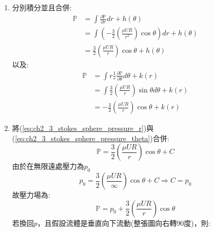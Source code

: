 \documentclass[../main.tex]{subfiles}
\begin{document}
\begin{itemize}
\begin{enumerate}
\begin{align}
            1 - \frac{3R}{4r} - \frac{R^3}{4r^3}
          \right) \sin\theta
        \right)
      \right) \right.\nonumber\\
      &\phantom{=\mu\quad} \left. + \frac{2}{r^2}\frac{\partial }{\partial \theta} \left(
        U \left(
          1 - \frac{3R}{2r} + \frac{R^3}{2r^3}
        \right) \cos\theta
      \right)
    \right] \nonumber\\
    &=\frac{3}{2}\left(
      \frac{\mu U R}{r^2}
    \right) \sin\theta
  \end{align}
  \item 分別積分並且合併:
  \begin{align}
    \mathbb{P} &= \int \frac{\partial \mathbb{P}}{\partial r} dr + h(\theta) \nonumber\\
    &= \int \left(
      -\frac{3}{2}\left(
        \frac{\mu U R}{r^2}
      \right) \cos\theta
    \right) dr + h(\theta) \nonumber\\
    &= \frac{3}{2}\left(
      \frac{\mu U R}{r}
    \right) \cos\theta + h(\theta) \label{eq:ch2_3_stokes_sphere_pressure_r}
  \end{align}
  以及:
  \begin{align}
    \mathbb{P} &= \int r \frac{1}{r}\frac{\partial \mathbb{P}}{\partial \theta} d\theta + k(r) \nonumber\\
    &= \int \frac{3}{2}\left(
      \frac{\mu U R}{r}
    \right) \sin\theta d\theta + k(r) \nonumber\\
    &= -\frac{3}{2}\left(
      \frac{\mu U R}{r}
    \right) \cos\theta + k(r) \label{eq:ch2_3_stokes_sphere_pressure_theta}
  \end{align}
  \item 將(\ref{eq:ch2_3_stokes_sphere_pressure_r})與(\ref{eq:ch2_3_stokes_sphere_pressure_theta})合併:
  \begin{equation}
    \mathbb{P} = \frac{3}{2}\left(
      \frac{\mu U R}{r}
    \right) \cos\theta + C
  \end{equation}
  由於在無限遠處壓力為$p_0$
  \begin{equation}
    p_0 = \frac{3}{2}\left(
      \frac{\mu U R}{\infty}
    \right) \cos\theta + C \Rightarrow C = p_0
  \end{equation}
  故壓力場為:
  \begin{equation}
    \boxed{\mathbb{P} = p_0 + \frac{3}{2}\left(
      \frac{\mu U R}{r}
    \right) \cos\theta}
  \end{equation}
  若換回$p$，且假設流體是垂直向下流動(整張圖向右轉90度)，則:
  \begin{equation}

\end{equation}
\end{enumerate}
\end{itemize}
\end{document}
